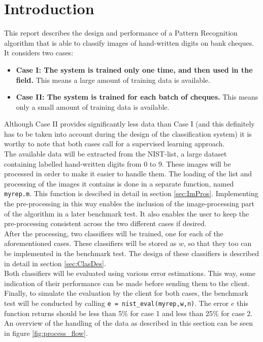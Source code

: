  \section{Introduction}
  \label{Intro}
  This report describes the design and performance of a Pattern Recognition algorithm that is able to classify images of hand-written digits on bank cheques. It considers two cases:
  \begin{itemize}
  	\item \textbf{Case I: The system is trained only one time, and then used in the field.} This means a large amount of training data is available.
  	\item \textbf{Case II: The system is trained for each batch of cheques.} This means only a small amount of training data is available.
  \end{itemize}
Although Case II provides significantly less data than Case I (and this definitely has to be taken into account during the design of the classification system) it is worthy to note that both cases call for a supervised learning approach. \\
The available data will be extracted from the NIST-list, a large dataset containing labelled hand-written digits from 0 to 9. These images will be processed in order to make it easier to handle them. The loading of the list and processing of the images it contains is done in a separate function, named \texttt{myrep.m}. This function is descibed in detail in section \ref{sec:ImPros}. Implementing the pre-processing in this way enables the inclusion of the image-processing part of the algorithm in a later benchmark test. It also enables the user to keep the pre-processing consistent across the two different cases if desired.\\
\noindent After the processing, two classifiers will be trained, one for each of the aforementioned cases. These classifiers will be stored as $w$, so that they too can be implemented in the benchmark test. The design of these classifiers is described in detail in section \ref{sec:ClasDes}. \\
Both classifiers will be evaluated using various error estimations. This way, some indication of their performance can be made before sending them to the client. \\
\noindent Finally, to simulate the evaluation by the client for both cases, the benchmark test will be conducted by calling \texttt{e = nist\_eval(myrep,w,n)}. The error $e$ this function returns should be less than 5\% for case 1 and less than 25\% for case 2. An overview of the handling of the data as described in this section can be seen in figure \ref{fig:process_flow}.
